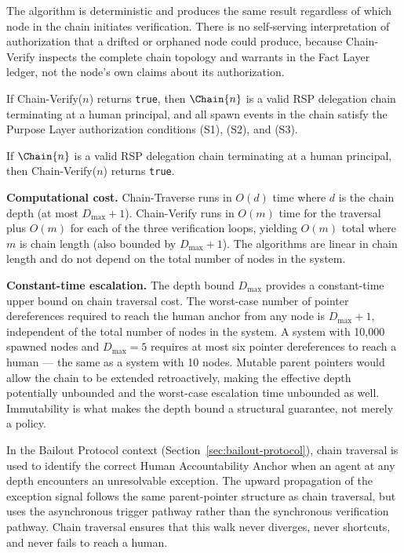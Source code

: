 The algorithm is deterministic and produces the same result regardless of which node in the chain initiates verification. There is no self-serving interpretation of authorization that a drifted or orphaned node could produce, because Chain-Verify inspects the complete chain topology and warrants in the Fact Layer ledger, not the node's own claims about its authorization.

\begin{prop}
\label{prop:chain-verify-soundness}
If Chain-Verify($n$) returns \texttt{true}, then $\Chain{n}$ is a valid RSP delegation chain terminating at a human principal, and all spawn events in the chain satisfy the Purpose Layer authorization conditions (S1), (S2), and (S3).
\end{prop}

\begin{prop}
\label{prop:chain-verify-completeness}
If $\Chain{n}$ is a valid RSP delegation chain terminating at a human principal, then Chain-Verify($n$) returns \texttt{true}.
\end{prop}

\medskip
\noindent\textbf{Computational cost.} Chain-Traverse runs in $O(d)$ time where $d$ is the chain depth (at most $D_{\max} + 1$). Chain-Verify runs in $O(m)$ time for the traversal plus $O(m)$ for each of the three verification loops, yielding $O(m)$ total where $m$ is chain length (also bounded by $D_{\max} + 1$). The algorithms are linear in chain length and do not depend on the total number of nodes in the system.

\medskip
\noindent\textbf{Constant-time escalation.} The depth bound $D_{\max}$ provides a constant-time upper bound on chain traversal cost. The worst-case number of pointer dereferences required to reach the human anchor from any node is $D_{\max} + 1$, independent of the total number of nodes in the system. A system with 10,000 spawned nodes and $D_{\max} = 5$ requires at most six pointer dereferences to reach a human --- the same as a system with 10 nodes. Mutable parent pointers would allow the chain to be extended retroactively, making the effective depth potentially unbounded and the worst-case escalation time unbounded as well. Immutability is what makes the depth bound a structural guarantee, not merely a policy.

In the Bailout Protocol context (Section~\ref{sec:bailout-protocol}), chain traversal is used to identify the correct Human Accountability Anchor when an agent at any depth encounters an unresolvable exception. The upward propagation of the exception signal follows the same parent-pointer structure as chain traversal, but uses the asynchronous trigger pathway rather than the synchronous verification pathway. Chain traversal ensures that this walk never diverges, never shortcuts, and never fails to reach a human.

